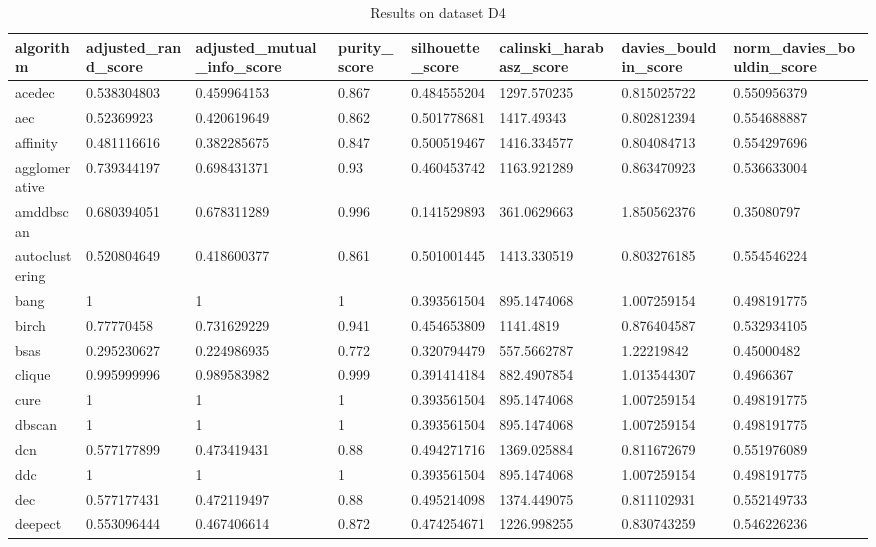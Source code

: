 \begin{table}[H]
\centering
\caption{Results on dataset D4}
\label{tab:params:D4}
\begin{tabular}{|l|l|l|l|l|l|l|l|}
\hline
algorithm & adjusted\_rand\_score & adjusted\_mutual\_info\_score & purity\_score & silhouette\_score & calinski\_harabasz\_score & davies\_bouldin\_score & norm\_davies\_bouldin\_score \\
\hline
acedec & 0.538304803 & 0.459964153 & 0.867 & 0.484555204 & 1297.570235 & 0.815025722 & 0.550956379 \\
\hline
aec & 0.52369923 & 0.420619649 & 0.862 & 0.501778681 & 1417.49343 & 0.802812394 & 0.554688887 \\
\hline
affinity & 0.481116616 & 0.382285675 & 0.847 & 0.500519467 & 1416.334577 & 0.804084713 & 0.554297696 \\
\hline
agglomerative & 0.739344197 & 0.698431371 & 0.93 & 0.460453742 & 1163.921289 & 0.863470923 & 0.536633004 \\
\hline
amddbscan & 0.680394051 & 0.678311289 & 0.996 & 0.141529893 & 361.0629663 & 1.850562376 & 0.35080797 \\
\hline
autoclustering & 0.520804649 & 0.418600377 & 0.861 & 0.501001445 & 1413.330519 & 0.803276185 & 0.554546224 \\
\hline
bang & 1 & 1 & 1 & 0.393561504 & 895.1474068 & 1.007259154 & 0.498191775 \\
\hline
birch & 0.77770458 & 0.731629229 & 0.941 & 0.454653809 & 1141.4819 & 0.876404587 & 0.532934105 \\
\hline
bsas & 0.295230627 & 0.224986935 & 0.772 & 0.320794479 & 557.5662787 & 1.22219842 & 0.45000482 \\
\hline
clique & 0.995999996 & 0.989583982 & 0.999 & 0.391414184 & 882.4907854 & 1.013544307 & 0.4966367 \\
\hline
cure & 1 & 1 & 1 & 0.393561504 & 895.1474068 & 1.007259154 & 0.498191775 \\
\hline
dbscan & 1 & 1 & 1 & 0.393561504 & 895.1474068 & 1.007259154 & 0.498191775 \\
\hline
dcn & 0.577177899 & 0.473419431 & 0.88 & 0.494271716 & 1369.025884 & 0.811672679 & 0.551976089 \\
\hline
ddc & 1 & 1 & 1 & 0.393561504 & 895.1474068 & 1.007259154 & 0.498191775 \\
\hline
dec & 0.577177431 & 0.472119497 & 0.88 & 0.495214098 & 1374.449075 & 0.811102931 & 0.552149733 \\
\hline
deepect & 0.553096444 & 0.467406614 & 0.872 & 0.474254671 & 1226.998255 & 0.830743259 & 0.546226236 \\

\end{tabular}
\end{table}

